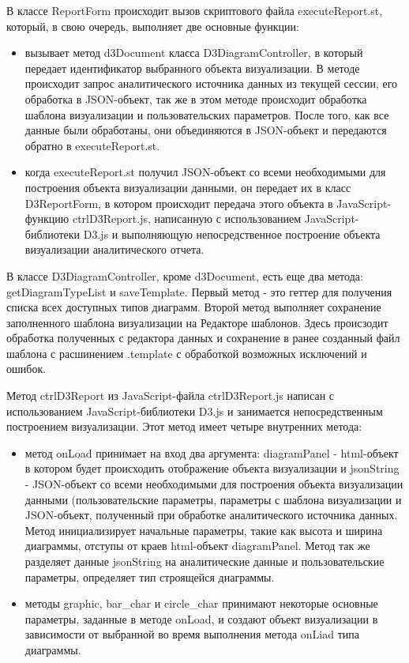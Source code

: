 \documentclass[a4paper]{extarticle}
\begin{document}
В классе ReportForm происходит вызов скриптового файла executeReport.st, который, в свою очередь, выполняет две основные функции:
\begin{itemize}
\item вызывает метод d3Document класса D3DiagramController, в который передает идентификатор выбранного объекта визуализации. В методе происходит запрос аналитического источника данных из текущей сессии, его обработка в JSON-объект, так же в этом методе происходит обработка шаблона визуализации и пользовательских параметров. После того, как все данные были обработаны, они объединяются в JSON-объект и передаются обратно в executeReport.st.
\item когда executeReport.st получил JSON-объект со всеми необходимыми для построения объекта визуализации данными, он передает их в класс D3ReportForm, в котором происходит передача этого объекта в JavaScript-функцию ctrlD3Report.js, написанную с использованием JavaScript-библиотеки D3.js и выполняющую непосредственное построение объекта визуализации аналитического отчета.
\end{itemize}
В классе D3DiagramController, кроме d3Document, есть еще два метода: getDiagramTypeList и saveTemplate. Первый метод - это геттер для получения списка всех доступных типов диаграмм. Второй метод выполняет сохранение заполненного шаблона визуализации на Редакторе шаблонов. Здесь происзодит обработка полученных с редактора данных и сохранение в ранее созданный файл шаблона с расшинением .template с обработкой возможных исключений и ошибок.\par
Метод ctrlD3Report из JavaScript-файла ctrlD3Report.js написан с использованием JavaScript-библиотеки D3.js и занимается непосредственным построением визуализации. Этот метод имеет четыре внутренних метода:
\begin{itemize}
\item метод onLoad принимает на вход два аргумента: diagramPanel - html-объект в котором будет происходить отображение объекта визуализации и jsonString - JSON-объект со всеми необходимыми для построения объекта визуализации данными (пользовательские параметры, параметры с шаблона визуализации и JSON-объект, полученный при обработке аналитического источника данных. Метод инициализирует начальные параметры, такие как высота и ширина диаграммы, отступы от краев html-объект diagramPanel. Метод так же разделяет данные jsonString на аналитические данные и пользовательские параметры, определяет тип строящейся диаграммы.
\item методы graphic, bar\_char и circle\_char принимают некоторые основные параметры, заданные в методе onLoad, и создают объект визуализации в зависимости от выбранной во время выполнения метода onLiad типа диаграммы.
\end{itemize}
\end{document}
